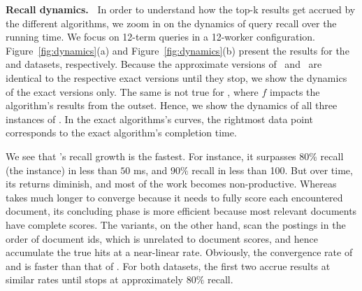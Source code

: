{\bf Recall dynamics.\ } 
In order to understand how the top-k results get accrued by the different algorithms, we zoom in on the dynamics of query 
recall over the running time. We focus on 12-term queries in a 12-worker configuration. 
Figure~\ref{fig:dynamics}(a) and Figure~\ref{fig:dynamics}(b) present the results for the \cw\/ and \cwten\/ datasets, respectively. 
Because the approximate versions of \alg\ and \pRA\ are  identical to the respective exact versions until they stop, 
we show the dynamics of the exact versions only.  The same is not true for \pBMW, where $f$ impacts the algorithm's results from the outset.
Hence, we show the dynamics of all three instances of \pBMW. 
In the exact algorithms's curves, the rightmost data point corresponds to the exact algorithm's completion time.   

We see that \alg's recall growth is the fastest. For instance, it surpasses $80\%$ recall (the \alg\lo\/ instance) in less than $50$ ms, 
and $90\%$ recall in less than 100. But over time, its returns  diminish, and most of the work becomes non-productive. Whereas
\pRA\/ takes much longer to converge because it needs to fully score each encountered document,  its concluding phase is more efficient because 
most relevant documents   have complete  scores. 
The \pBMW\/ variants, on the other hand, scan the postings in the order of document ids, which is unrelated to document scores, and hence accumulate the true hits 
at a near-linear rate. Obviously, the convergence rate of \pBMW\hi\/ and \pBMW\lo\/ is faster than that of \pBMW\ex. For both datasets, the first 
two accrue results at similar rates until \pBMW\lo\/ stops at approximately $80\%$ recall. 


